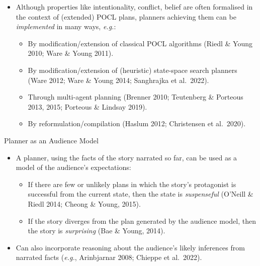\documentclass[utf8,13pt]{beamer}
\begin{document}
\begin{frame}
  \begin{itemize}
  \item Although properties like intentionality, conflict, belief are
    often formalised in the context of (extended) POCL plans, planners
    achieving them can be \emph{implemented} in many ways, \textit{e.g.}:
    \begin{itemize}
    \item By modification/extension of classical POCL algorithms
      (Riedl \& Young 2010; Ware \& Young 2011).
    \item By modification/extension of (heuristic) state-space
      search planners (Ware 2012; Ware \& Young 2014;
      Sanghrajka et al.\ 2022).
    \item Through multi-agent planning (Brenner 2010;
      Teutenberg \& Porteous 2013, 2015; Porteous \& Lindsay 2019).
    \item By reformulation/compilation (Haslum 2012; Christensen
      et al.\ 2020).
    \end{itemize}
  \end{itemize}
\end{frame}

\begin{frame}{Planner as an Audience Model}
  \begin{itemize}
  \item A planner, using the facts of the story narrated so far, can
    be used as a model of the audience's expectations:
    \begin{itemize}
    \item If there are few or unlikely plans in which the story's
      protagonist is successful from the current state, then the
      state is \emph{suspenseful}
      (O'Neill \& Riedl 2014; Cheong \& Young, 2015).
    \item If the story diverges from the plan generated by the
      audience model, then the story is \emph{surprising}
      (Bae \& Young, 2014).
    \end{itemize}
  \item Can also incorporate reasoning about the audience's likely
    inferences from narrated facts (\textit{e.g.}, Arinbjarnar 2008;
    Chieppe et al.\ 2022).
  \end{itemize}
\end{frame}

\end{document}
